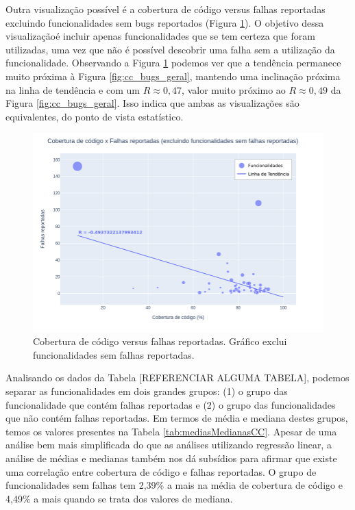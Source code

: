 \documentclass[11.5pt]{article}
\begin{document}
Outra visualização possível é a cobertura de código versus falhas reportadas excluindo
funcionalidades sem bugs reportados (Figura \ref{fig:cc_bugs_com_bugs}).
O objetivo dessa visualizaçãoé incluir apenas funcionalidades que se tem certeza que foram
utilizadas, uma vez que não é possível descobrir uma falha sem a utilização da funcionalidade.
Observando a Figura \ref{fig:cc_bugs_com_bugs} podemos ver que a tendência permanece muito próxima
à Figura \ref{fig:cc_bugs_geral}, mantendo uma inclinação próxima na linha de tendência e com um
$R \approx 0,47$, valor muito próximo ao $R \approx 0,49$ da Figura \ref{fig:cc_bugs_geral}.
Isso indica que ambas as visualizações são equivalentes, do ponto de vista estatístico.

\begin{figure}[ht]
    \centering
    \includegraphics[width=1.0\textwidth]{cc_bugs_com_bugs.png}
    \caption{Cobertura de código versus falhas reportadas. Gráfico exclui funcionalidades sem
falhas reportadas.}
    \label{fig:cc_bugs_com_bugs}
\end{figure}

Analisando os dados da Tabela [REFERENCIAR ALGUMA TABELA], podemos separar as funcionalidades em
dois grandes grupos:
(1) o grupo das funcionalidade que contém falhas reportadas e
(2) o grupo das funcionalidades que não contém falhas reportadas.
Em termos de média e mediana destes grupos, temos os valores presentes na Tabela
\ref{tab:mediasMedianasCC}.
Apesar de uma análise bem mais simplificada do que as análises utilizando regressão linear, a
análise de médias e medianas também nos dá subsídios para afirmar que existe uma correlação entre
cobertura de código e falhas reportadas.
O grupo de funcionalidades sem falhas tem 2,39\% a mais na média de cobertura de código e 4,49\% a
mais quando se trata dos valores de mediana.
\end{document}
